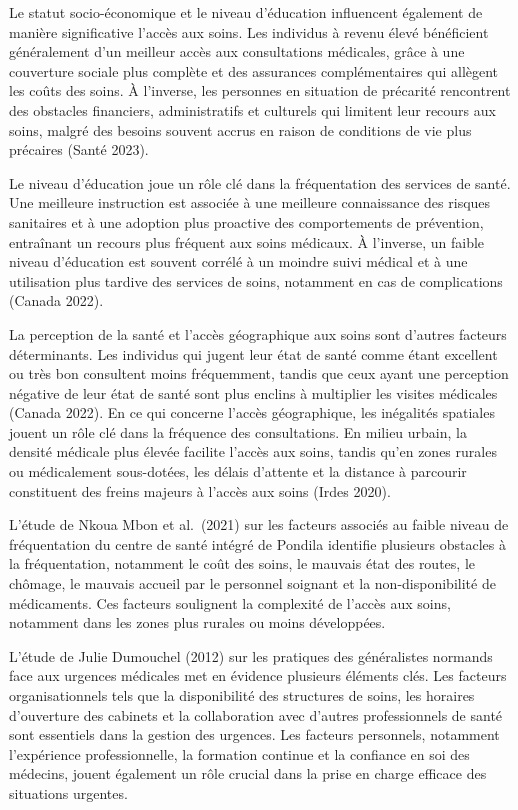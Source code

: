\documentclass[
]{article}
\begin{document}
Le statut socio-économique et le niveau d'éducation influencent
également de manière significative l'accès aux soins. Les individus à
revenu élevé bénéficient généralement d'un meilleur accès aux
consultations médicales, grâce à une couverture sociale plus complète et
des assurances complémentaires qui allègent les coûts des soins. À
l'inverse, les personnes en situation de précarité rencontrent des
obstacles financiers, administratifs et culturels qui limitent leur
recours aux soins, malgré des besoins souvent accrus en raison de
conditions de vie plus précaires (Santé 2023).

Le niveau d'éducation joue un rôle clé dans la fréquentation des
services de santé. Une meilleure instruction est associée à une
meilleure connaissance des risques sanitaires et à une adoption plus
proactive des comportements de prévention, entraînant un recours plus
fréquent aux soins médicaux. À l'inverse, un faible niveau d'éducation
est souvent corrélé à un moindre suivi médical et à une utilisation plus
tardive des services de soins, notamment en cas de complications (Canada
2022).

La perception de la santé et l'accès géographique aux soins sont
d'autres facteurs déterminants. Les individus qui jugent leur état de
santé comme étant excellent ou très bon consultent moins fréquemment,
tandis que ceux ayant une perception négative de leur état de santé sont
plus enclins à multiplier les visites médicales (Canada 2022). En ce qui
concerne l'accès géographique, les inégalités spatiales jouent un rôle
clé dans la fréquence des consultations. En milieu urbain, la densité
médicale plus élevée facilite l'accès aux soins, tandis qu'en zones
rurales ou médicalement sous-dotées, les délais d'attente et la distance
à parcourir constituent des freins majeurs à l'accès aux soins (Irdes
2020).

L'étude de Nkoua Mbon et al.~(2021) sur les facteurs associés au faible
niveau de fréquentation du centre de santé intégré de Pondila identifie
plusieurs obstacles à la fréquentation, notamment le coût des soins, le
mauvais état des routes, le chômage, le mauvais accueil par le personnel
soignant et la non-disponibilité de médicaments. Ces facteurs soulignent
la complexité de l'accès aux soins, notamment dans les zones plus
rurales ou moins développées.

L'étude de Julie Dumouchel (2012) sur les pratiques des généralistes
normands face aux urgences médicales met en évidence plusieurs éléments
clés. Les facteurs organisationnels tels que la disponibilité des
structures de soins, les horaires d'ouverture des cabinets et la
collaboration avec d'autres professionnels de santé sont essentiels dans
la gestion des urgences. Les facteurs personnels, notamment l'expérience
professionnelle, la formation continue et la confiance en soi des
médecins, jouent également un rôle crucial dans la prise en charge
efficace des situations urgentes.
\end{document}
